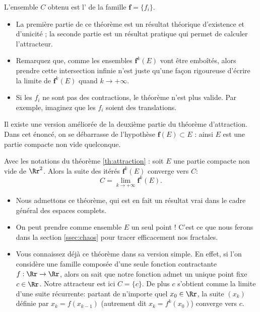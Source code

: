 \documentclass[11pt,class=report,crop=false]{standalone}
\begin{document}
L'ensemble $C$ obtenu est l' de la famille
$\mathbf{f}=\{f_i\}$.

\begin{remarque*}
\sauteligne
\begin{itemize}

 \item La première partie de ce théorème est un résultat théorique d'existence et d'unicité ;
la seconde partie est un résultat pratique qui permet de calculer l'attracteur.


  \item Remarquez que, comme les ensembles $\mathbf{f}^k(E)$ vont être emboîtés, 
alors prendre cette intersection infinie n'est juste qu'une façon rigoureuse d'écrire la limite de $\mathbf{f}^k(E)$ quand $k\to +\infty$.

 \item Si les $f_i$ ne sont pas des contractions, le théorème n'est plus valide. Par exemple,
imaginez que les $f_i$ soient des translations.
\end{itemize}
\end{remarque*}

\bigskip

Il existe une version améliorée de la deuxième partie du théorème d'attraction.
Dans cet énoncé, on se débarrasse de l'hypothèse $\mathbf{f}(E) \subset E$ : ainsi 
$E$ est une partie compacte non vide quelconque. 

\begin{theoreme}
\label{th:attractionbis}
Avec les notations du théorème \ref{th:attraction} :
soit $E$ une partie compacte non vide de $\Rr^2$. Alors 
la suite des itérés $\mathbf{f}^k(E)$ converge vers $C$:
$$C = \lim_{k\to+\infty} \mathbf{f}^k(E).$$
\end{theoreme}

\begin{remarque*}
\sauteligne
\begin{itemize}
  \item Nous admettons ce théorème, qui est en fait un résultat vrai dans le cadre général des espaces complets.
  
  \item On peut prendre comme ensemble $E$ un seul point ! C'est ce que nous ferons
  dans la section \ref{ssec:chaos} pour tracer efficacement nos fractales.
  
  \item Vous connaissez déjà ce théorème dans sa version simple. En effet, si l'on considère une famille composée d'une seule fonction contractante $f : \Rr \to \Rr$,
alors on sait que notre fonction admet un unique point fixe $c\in \Rr$. Notre attracteur est ici $C=\{c\}$.
De plus $c$ s'obtient comme la limite d'une suite récurrente: partant de n'importe quel $x_0 \in \Rr$,
la suite $(x_k)$ définie par $x_{k}= f(x_{k-1})$ (autrement dit $x_k = f^k(x_0)$) converge vers $c$.
\end{itemize}
\end{remarque*}
\end{document}
